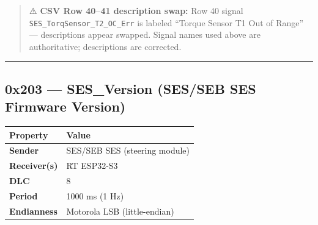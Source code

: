 \begin{quote}
⚠️ \textbf{CSV Row 40--41 description swap:} Row 40 signal
\texttt{SES\_TorqSensor\_T2\_OC\_Err} is labeled ``Torque Sensor T1 Out of
Range'' --- descriptions appear swapped. Signal names used above are
authoritative; descriptions are corrected.
\end{quote}

\begin{center}\rule{0.5\linewidth}{0.5pt}\end{center}

\subsection{0x203 --- SES\_Version (SES/SEB SES Firmware
Version)}\label{x203-ses_version-SES/SEB-SES-firmware-version}

\begin{longtable}[]{@{}ll@{}}
\toprule\noalign{}
Property & Value \\
\midrule\noalign{}
\endhead
\bottomrule\noalign{}
\endlastfoot
\textbf{Sender} & SES/SEB SES (steering module) \\
\textbf{Receiver(s)} & RT ESP32-S3 \\
\textbf{DLC} & 8 \\
\textbf{Period} & 1000 ms (1 Hz) \\
\textbf{Endianness} & Motorola LSB (little-endian) \\
\end{longtable}

